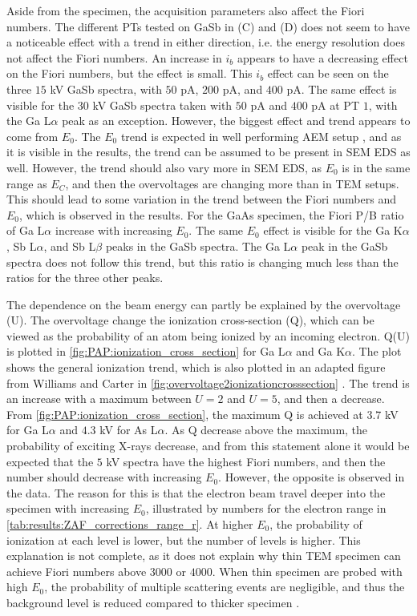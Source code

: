Aside from the specimen, the acquisition parameters also affect the Fiori numbers.
The different PTs tested on GaSb in (C) and (D) does not seem to have a noticeable effect with a trend in either direction, i.e. the energy resolution does not affect the Fiori numbers.
An increase in $i_b$ appears to have a decreasing effect on the Fiori numbers, but the effect is small.
This $i_b$ effect can be seen on the three $15$ kV GaSb spectra, with $50$ pA, $200$ pA, and $400$ pA.
The same effect is visible for the $30$ kV GaSb spectra taken with $50$ pA and $400$ pA at PT $1$, with the Ga L$\alpha$ peak as an exception.
However, the biggest effect and trend appears to come from $E_0$.
The $E_0$ trend is expected in well performing AEM setup \cite{williams_carter_tem_2009}, and as it is visible in the results, the trend can be assumed to be present in SEM EDS as well.
However, the trend should also vary more in SEM EDS, as $E_0$ is in the same range as $E_C$, and then the overvoltages are changing more than in TEM setups.
This should lead to some variation in the trend between the Fiori numbers and $E_0$, which is observed in the results.
For the GaAs specimen, the Fiori P/B ratio of Ga L$\alpha$ increase with increasing $E_0$.
The same $E_0$ effect is visible for the Ga K$\alpha$, Sb L$\alpha$, and Sb L$\beta$ peaks in the GaSb spectra.
The Ga L$\alpha$ peak in the GaSb spectra does not follow this trend, but this ratio is changing much less than the ratios for the three other peaks.


The dependence on the beam energy can partly be explained by the overvoltage (U).
The overvoltage change the ionization cross-section (Q), which can be viewed as the probability of an atom being ionized by an incoming electron.
Q(U) is plotted in \cref{fig:PAP:ionization_cross_section} for Ga L$\alpha$ and Ga K$\alpha$.
The plot shows the general ionization trend, which is also plotted in an adapted figure from Williams and Carter in \cref{fig:overvoltage2ionizationcrosssection} \cite{williams_carter_tem_2009}.
The trend is an increase with a maximum between $U=2$ and $U=5$, and then a decrease.
From \cref{fig:PAP:ionization_cross_section}, the maximum Q is achieved at $3.7$ kV for Ga L$\alpha$ and $4.3$ kV for As L$\alpha$.
As Q decrease above the maximum, the probability of exciting X-rays decrease, and from this statement alone it would be expected that the $5$ kV spectra have the highest Fiori numbers, and then the number should decrease with increasing $E_0$.
However, the opposite is observed in the data.
The reason for this is that the electron beam travel deeper into the specimen with increasing $E_0$, illustrated by numbers for the electron range in \cref{tab:results:ZAF_corrections_range_r}.
At higher $E_0$, the probability of ionization at each level is lower, but the number of levels is higher.
This explanation is not complete, as it does not explain why thin TEM specimen can achieve Fiori numbers above $3000$ or $4000$.
When thin specimen are probed with high $E_0$, the probability of multiple scattering events are negligible, and thus the background level is reduced compared to thicker specimen \cite{liao2006practical}.


